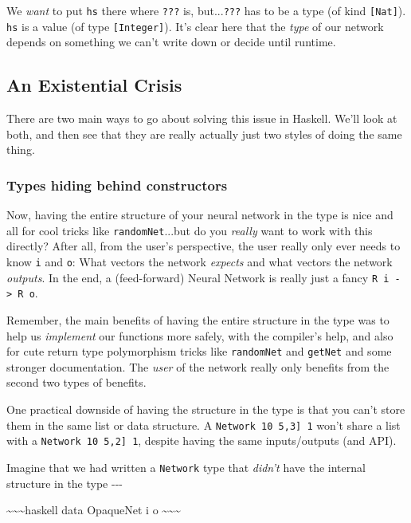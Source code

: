\documentclass[]{article}
\begin{document}
We \emph{want} to put \texttt{hs} there where \texttt{???} is,
but...\texttt{???} has to be a type (of kind \texttt{{[}Nat{]}}). \texttt{hs} is
a value (of type \texttt{{[}Integer{]}}). It's clear here that the \emph{type}
of our network depends on something we can't write down or decide until runtime.

\subsection{An Existential Crisis}

There are two main ways to go about solving this issue in Haskell. We'll look at
both, and then see that they are really actually just two styles of doing the
same thing.

\subsubsection{Types hiding behind constructors}

Now, having the entire structure of your neural network in the type is nice and
all for cool tricks like \texttt{randomNet}...but do you \emph{really} want to
work with this directly? After all, from the user's perspective, the user really
only ever needs to know \texttt{i} and \texttt{o}: What vectors the network
\emph{expects} and what vectors the network \emph{outputs}. In the end, a
(feed-forward) Neural Network is really just a fancy
\texttt{R\ i\ -\textgreater{}\ R\ o}.

Remember, the main benefits of having the entire structure in the type was to
help us \emph{implement} our functions more safely, with the compiler's help,
and also for cute return type polymorphism tricks like \texttt{randomNet} and
\texttt{getNet} and some stronger documentation. The \emph{user} of the network
really only benefits from the second two types of benefits.

One practical downside of having the structure in the type is that you can't
store them in the same list or data structure. A
\texttt{Network\ 10\ \textquotesingle{}{[}5,3{]}\ 1} won't share a list with a
\texttt{Network\ 10\ \textquotesingle{}{[}5,2{]}\ 1}, despite having the same
inputs/outputs (and API).

Imagine that we had written a \texttt{Network} type that \emph{didn't} have the
internal structure in the type -\/-\/-

\textasciitilde{}\textasciitilde{}\textasciitilde{}haskell data OpaqueNet i o
\textasciitilde{}\textasciitilde{}\textasciitilde{}
\end{document}
